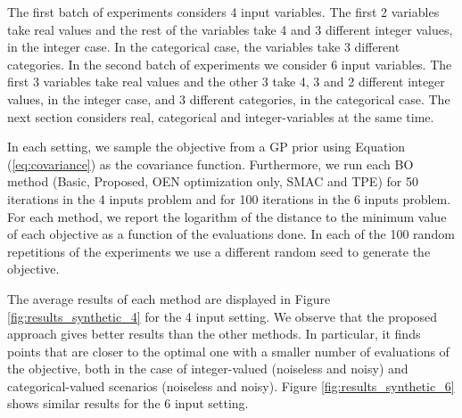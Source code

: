 The first batch of experiments considers 4 input variables. The first 2 variables take real values and the
rest of the variables take 4 and 3 different integer values, in the integer case. In the categorical case, the variables take 3 different categories.
In the second batch of experiments we consider 6 input variables. The first 3 variables
take real values and the other 3 take 4, 3 and 2 different integer values, in the integer case, and 3 different
categories, in the categorical case. The next section considers real, categorical and integer-variables at the same time.

In each setting, we sample the objective from a GP prior using Equation (\ref{eq:covariance}) as the covariance function.
Furthermore, we run each BO method (Basic, Proposed, OEN optimization only, SMAC and TPE) for 50 iterations in the
4 inputs problem and for 100 iterations in the 6 inputs problem. For each method, we report the logarithm
of the distance to the minimum value of each objective as a function of the evaluations done. In each of the 100
random repetitions of the experiments we use a different random seed to generate the objective.

The average results of each method are displayed in Figure \ref{fig:results_synthetic_4}
for the 4 input setting. We observe that the proposed approach gives better results than the other methods.
In particular, it finds points that are closer to the optimal one with a smaller number of evaluations of the
objective, both in the case of integer-valued (noiseless and noisy) and categorical-valued scenarios (noiseless and noisy).
Figure \ref{fig:results_synthetic_6} shows similar results for the 6 input setting.

